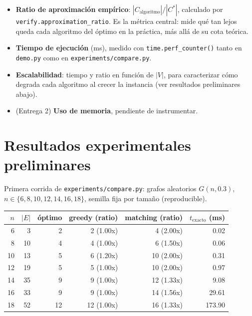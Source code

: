 \documentclass[11pt,a4paper]{article}
\begin{document}
\begin{itemize}
	\item \textbf{Ratio de aproximación empírico}: $|C_{\text{algoritmo}}| / |C^{*}|$,
	calculado por \texttt{verify.approximation\_ratio}. Es la métrica central: mide qué tan
	lejos queda cada algoritmo del óptimo en la práctica, más allá de su cota teórica.
	\item \textbf{Tiempo de ejecución} (ms), medido con \texttt{time.perf\_counter()} tanto en
	\texttt{demo.py} como en \texttt{experiments/compare.py}.
	\item \textbf{Escalabilidad}: tiempo y ratio en función de $|V|$, para caracterizar cómo
	degrada cada algoritmo al crecer la instancia (ver resultados preliminares abajo).
	\item (Entrega 2) \textbf{Uso de memoria}, pendiente de instrumentar.
\end{itemize}

\section{Resultados experimentales preliminares}
\label{sec:resultados}

Primera corrida de \texttt{experiments/compare.py}: grafos aleatorios $G(n, 0.3)$,
$n \in \{6,8,10,12,14,16,18\}$, semilla fija por tamaño (reproducible).

\begin{center}
\begin{tabular}{rrrrrr}
	\toprule
	$n$ & $|E|$ & óptimo & greedy (ratio) & matching (ratio) & $t_{\text{exacto}}$ (ms) \\
	\midrule
	6  & 3  & 2  & 2 (1.00x)  & 4 (2.00x)  & 0.02 \\
	8  & 10 & 4  & 4 (1.00x)  & 6 (1.50x)  & 0.06 \\
	10 & 13 & 5  & 6 (1.20x)  & 10 (2.00x) & 0.31 \\
	12 & 19 & 5  & 5 (1.00x)  & 10 (2.00x) & 0.97 \\
	14 & 35 & 9  & 9 (1.00x)  & 12 (1.33x) & 9.08 \\
	16 & 33 & 9  & 9 (1.00x)  & 14 (1.56x) & 29.61 \\
	18 & 52 & 12 & 12 (1.00x) & 16 (1.33x) & 173.90 \\
	\bottomrule
\end{tabular}
\end{center}
\end{document}
